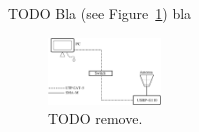 TODO Bla (see Figure~\ref{fig:example}) bla

\begin{figure}[htbp]
  \centering
  \includegraphics[width = 3cm]{sect2/figures/example_to_be_removed.eps}
  \caption{TODO remove.}
  \label{fig:example}
\end{figure}

